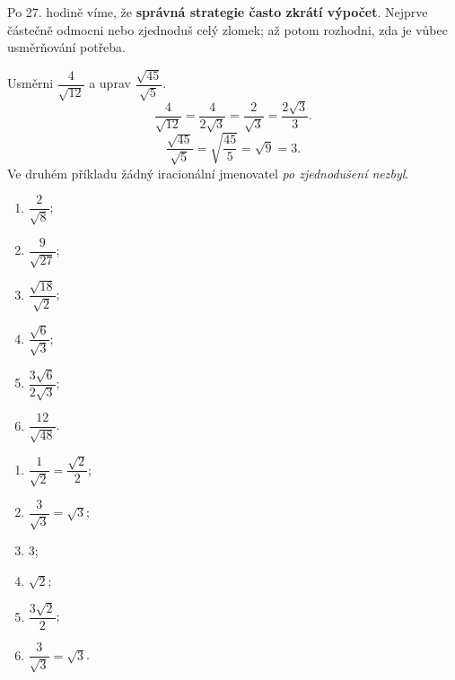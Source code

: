 \documentclass[11pt,a4paper]{article}
\begin{document}
Po 27. hodině víme, že \textbf{správná strategie často zkrátí výpočet}.
Nejprve částečně odmocni nebo zjednoduš celý zlomek; až potom
rozhodni, zda je vůbec usměrňování potřeba.
\begin{prikladReseniBox}[breakable=false,title={Příklad 2: dva postupy, stejná hodnota}]
Usměrni $\dfrac4{\sqrt{12}}$ a uprav $\dfrac{\sqrt{45}}{\sqrt5}$.
\tcblower
\[
\frac4{\sqrt{12}}=\frac4{2\sqrt3}=\frac2{\sqrt3}
=\boxed{\frac{2\sqrt3}{3}}.
\]
\[
\frac{\sqrt{45}}{\sqrt5}=\sqrt{\frac{45}{5}}=\sqrt9=\boxed3.
\]
Ve druhém příkladu žádný iracionální jmenovatel \emph{po zjednodušení nezbyl}.
\end{prikladReseniBox}
\begin{zadaniReseniBox}[breakable=false,title={Samostatná práce 2: vyber nejkratší postup}]
\begin{enumerate}[label=\alph*)]
\item $\dfrac2{\sqrt8}$; \item $\dfrac9{\sqrt{27}}$;
\item $\dfrac{\sqrt{18}}{\sqrt2}$;
\item $\dfrac{\sqrt6}{\sqrt3}$;
\item $\dfrac{3\sqrt6}{2\sqrt3}$;
\item $\dfrac{12}{\sqrt{48}}$.
\end{enumerate}
\tcblower
\begin{enumerate}[label=\alph*)]
\item $\dfrac1{\sqrt2}=\dfrac{\sqrt2}{2}$;
\item $\dfrac3{\sqrt3}=\sqrt3$;
\item $3$; \item $\sqrt2$;
\item $\dfrac{3\sqrt2}2$;
\item $\dfrac3{\sqrt3}=\sqrt3$.
\end{enumerate}
\end{zadaniReseniBox}
\end{document}
